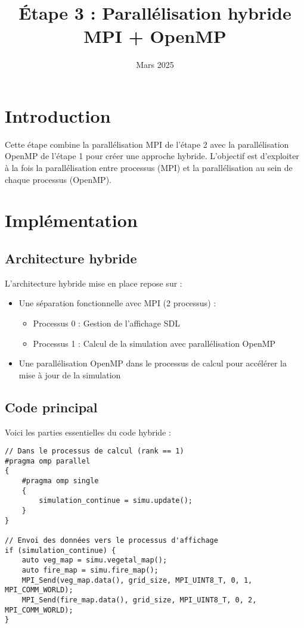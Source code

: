 \documentclass[a4paper,12pt]{article}
\title{Étape 3 : Parallélisation hybride MPI + OpenMP}
\date{Mars 2025}
\begin{document}
\maketitle

\section{Introduction}
Cette étape combine la parallélisation MPI de l'étape 2 avec la parallélisation OpenMP de l'étape 1 pour créer une approche hybride. L'objectif est d'exploiter à la fois la parallélisation entre processus (MPI) et la parallélisation au sein de chaque processus (OpenMP).

\section{Implémentation}

\subsection{Architecture hybride}
L'architecture hybride mise en place repose sur :
\begin{itemize}
    \item Une séparation fonctionnelle avec MPI (2 processus) :
    \begin{itemize}
        \item Processus 0 : Gestion de l'affichage SDL
        \item Processus 1 : Calcul de la simulation avec parallélisation OpenMP
    \end{itemize}
    \item Une parallélisation OpenMP dans le processus de calcul pour accélérer la mise à jour de la simulation
\end{itemize}

\subsection{Code principal}
Voici les parties essentielles du code hybride :

\begin{lstlisting}[caption={Processus de calcul avec OpenMP}, label={lst:hybrid}]
// Dans le processus de calcul (rank == 1)
#pragma omp parallel
{
    #pragma omp single
    {
        simulation_continue = simu.update();
    }
}

// Envoi des données vers le processus d'affichage
if (simulation_continue) {
    auto veg_map = simu.vegetal_map();
    auto fire_map = simu.fire_map();
    MPI_Send(veg_map.data(), grid_size, MPI_UINT8_T, 0, 1, MPI_COMM_WORLD);
    MPI_Send(fire_map.data(), grid_size, MPI_UINT8_T, 0, 2, MPI_COMM_WORLD);
}
\end{lstlisting}
\end{document}
